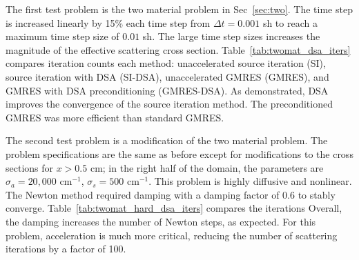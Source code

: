 {The first test problem is the two material
problem in Sec~\ref{sec:two}.     The time step is increased linearly by 15\% each time step from $\Delta
t=0.001$ sh to reach a maximum time step size of $0.01$ sh.  The large time step sizes
increases the magnitude of the effective scattering cross section.
Table~\ref{tab:twomat_dsa_iters} compares iteration counts each method: unaccelerated
source iteration (SI), source iteration with DSA (SI-DSA), unaccelerated GMRES (GMRES),
and GMRES with DSA preconditioning (GMRES-DSA).  As demonstrated, DSA improves the
convergence of the source iteration method.  The preconditioned GMRES was more efficient
than standard GMRES.

The second test problem is a modification of the two material problem. The problem
specifications are the same as before except for modifications to the cross sections for
$x>0.5$ cm; in the right half of the domain, the
parameters are $\sigma_a = 20,000$ cm$^{-1}$, $\sigma_s=500 $ cm$^{-1}$.  This problem is
highly diffusive and nonlinear. The Newton method required damping with a damping factor of $0.6$ to
stably converge.  Table~\ref{tab:twomat_hard_dsa_iters} compares the iterations
Overall, the damping increases the number of Newton steps, as expected. For this problem,
acceleration is much more critical, reducing the number of scattering iterations by a
factor of 100.  

}
